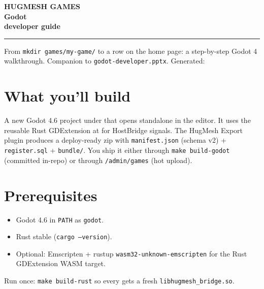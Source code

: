 \documentclass[11pt,a4paper,openany]{book}
\begin{document}
\begin{titlepage}\thispagestyle{empty}
\noindent{}
\vspace*{4cm}\noindent
{\sffamily\bfseries
  {\color{snapAccentTwo}\fontsize{18}{22}\selectfont HUGMESH GAMES}\\[3mm]
  {\color{white}\fontsize{42}{50}\selectfont Godot\\developer guide}\par}
\vspace{1.5cm}\noindent\color{white!75!snapAccentTwo}\rule{0.4\linewidth}{1.2pt}
\vspace{0.8cm}\noindent
{\sffamily\color{white!85}\large
From \texttt{mkdir games/my-game/} to a row on the home page: a
step-by-step Godot 4 walkthrough.}
\vfill\noindent
{\sffamily\color{white!70}\small
Companion to \texttt{godot-developer.pptx}. Generated: \snapbuilddate{} \snapbuildtime}
\end{titlepage}

\frontmatter\pagestyle{empty}\tableofcontents\clearpage
\mainmatter\pagestyle{fancy}

\chapter{What you'll build}
A new Godot 4.6 project under  that opens
standalone in the editor. It uses the reusable Rust GDExtension at
 for HostBridge signals. The
HugMesh Export plugin produces a deploy-ready zip with
\texttt{manifest.json} (schema v2) + \texttt{register.sql} +
\texttt{bundle/}. You ship it either through \texttt{make build-godot}
(committed in-repo) or through \texttt{/admin/games} (hot upload).

\chapter{Prerequisites}
\begin{itemize}
  \item Godot 4.6 in \texttt{PATH} as \texttt{godot}.
  \item Rust stable (\texttt{cargo --version}).
  \item Optional: Emscripten + rustup \texttt{wasm32-unknown-emscripten}
        for the Rust GDExtension WASM target.
\end{itemize}
Run once: \texttt{make build-rust} so every 
gets a fresh \texttt{libhugmesh\_bridge.so}.
\end{document}
